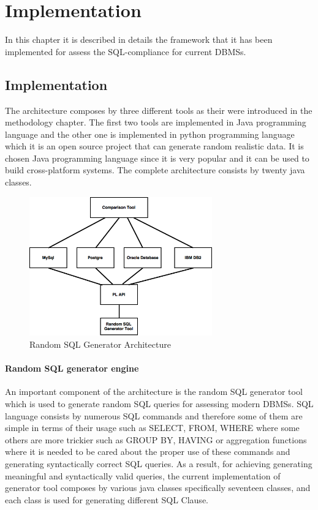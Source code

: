 \chapter{Implementation}
In this chapter it is described in details the framework that it has been implemented for assess the SQL-compliance for current DBMSs.

\section{Implementation}
The architecture composes by three different tools as their were introduced in the methodology chapter. The first two tools are implemented in Java programming language and the other one is implemented in python programming language which it is an open source project that can generate random realistic data.  It is chosen Java programming language since it is very popular and it can be used to build cross-platform systems. The complete architecture consists by twenty java classes. 


 \begin{figure} 
      \centering
      \includegraphics[width=\textwidth,height=6cm]{Images/Chapter4/1-implemen_detail}
      \caption{Random SQL Generator Architecture}
      \label{fig:counting-methods}
    \end{figure}

\subsubsection{Random SQL generator engine}
An important component of the architecture is the random SQL generator tool which is used to generate random SQL queries for assessing modern DBMSs. SQL language consists by numerous SQL commands and therefore some of them are simple in terms of their usage such as SELECT, FROM, WHERE where some others are more trickier such as GROUP BY, HAVING or aggregation functions where it is needed to be cared about the proper use of these commands and generating syntactically correct SQL queries. As a result, for achieving generating meaningful and syntactically valid queries, the current implementation of generator tool composes by various java classes specifically seventeen classes, and each class is used for generating different SQL Clause. 

